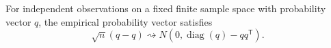 For independent observations on a fixed finite sample space with probability vector \(q\), the empirical probability vector satisfies
\[
\sqrt n(\widehat q-q)\rightsquigarrow
N\!\left(0,\operatorname{diag}(q)-qq^{\mathsf T}\right).
\]